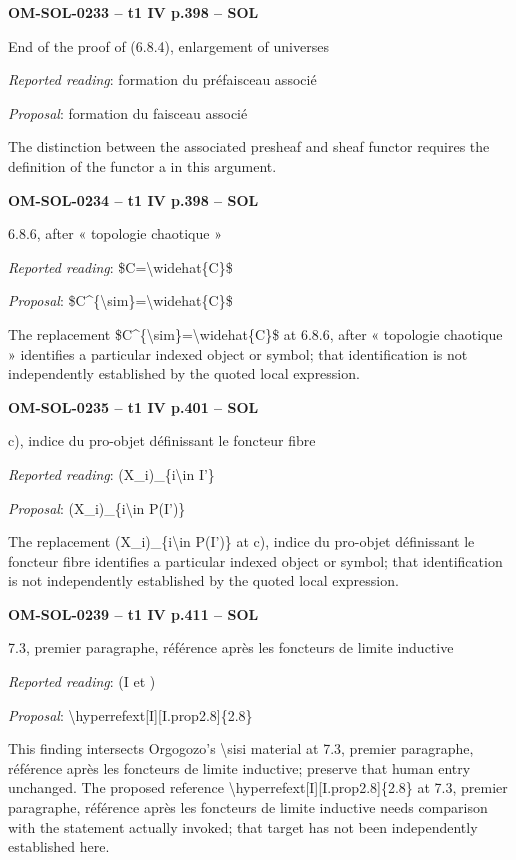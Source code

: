 \par\noindent\textbf{OM-SOL-0233 -- t1 IV p.398 -- SOL}\par
End of the proof of (6.8.4), enlargement of universes\par
\emph{Reported reading}: formation du préfaisceau associé\par
\emph{Proposal}: formation du faisceau associé\par
The distinction between the associated presheaf and sheaf functor requires the definition of the functor a in this argument.\par
\par\noindent\textbf{OM-SOL-0234 -- t1 IV p.398 -- SOL}\par
6.8.6, after « topologie chaotique »\par
\emph{Reported reading}: \$C=\allowbreak \textbackslash{}widehat\{C\}\$\par
\emph{Proposal}: \$C\textasciicircum{}\{\textbackslash{}sim\}=\allowbreak \textbackslash{}widehat\{C\}\$\par
The replacement \$C\textasciicircum{}\{\textbackslash{}sim\}=\allowbreak \textbackslash{}widehat\{C\}\$ at 6.8.6, after « topologie chaotique » identifies a particular indexed object or symbol; that identification is not independently established by the quoted local expression.\par
\par\noindent\textbf{OM-SOL-0235 -- t1 IV p.401 -- SOL}\par
c), indice du pro-objet définissant le foncteur fibre\par
\emph{Reported reading}: (X\_i)\_\{i\textbackslash{}in I'\}\par
\emph{Proposal}: (X\_i)\_\{i\textbackslash{}in P(I')\}\par
The replacement (X\_i)\_\{i\textbackslash{}in P(I')\} at c), indice du pro-objet définissant le foncteur fibre identifies a particular indexed object or symbol; that identification is not independently established by the quoted local expression.\par
\par\noindent\textbf{OM-SOL-0239 -- t1 IV p.411 -- SOL}\par
7.3, premier paragraphe, référence après les foncteurs de limite inductive\par
\emph{Reported reading}: (I et )\par
\emph{Proposal}: \textbackslash{}hyperrefext[I][I.prop2.8]\{2.8\}\par
This finding intersects Orgogozo's \textbackslash{}sisi material at 7.3, premier paragraphe, référence après les foncteurs de limite inductive; preserve that human entry unchanged. The proposed reference \textbackslash{}hyperrefext[I][I.prop2.8]\{2.8\} at 7.3, premier paragraphe, référence après les foncteurs de limite inductive needs comparison with the statement actually invoked; that target has not been independently established here.\par
